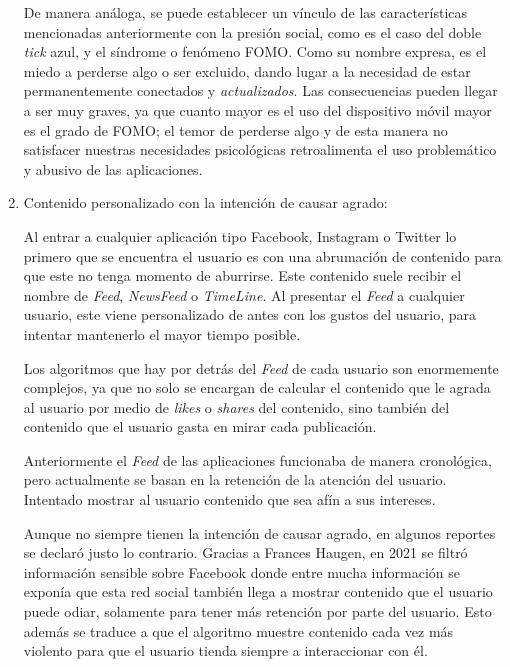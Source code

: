 \begin{enumerate}
    De manera análoga, se puede establecer un vínculo de las características mencionadas anteriormente con la presión social, como es el caso del doble \textit{tick} azul, y el síndrome o fenómeno \ac{FOMO}. Como su nombre expresa, es el miedo a perderse algo o ser excluido, dando lugar a la necesidad de estar permanentemente conectados y \textit{actualizados}. Las consecuencias pueden llegar a ser muy graves, ya que cuanto mayor es el uso del dispositivo móvil mayor es el grado de \acs{FOMO}; el temor de perderse algo y de esta manera no satisfacer nuestras necesidades psicológicas retroalimenta el uso problemático y abusivo de las aplicaciones. \cite{Adiccion-RRSS-FOMO}

    \item Contenido personalizado con la intención de causar agrado:

    Al entrar a cualquier aplicación tipo Facebook, Instagram o Twitter lo primero que se encuentra el usuario es con una abrumación de contenido para que este no tenga momento de aburrirse. Este contenido suele recibir el nombre de \textit{Feed}, \textit{NewsFeed} o \textit{TimeLine}. Al presentar el \textit{Feed} a cualquier usuario, este viene personalizado de antes con los gustos del usuario, para intentar mantenerlo el mayor tiempo posible.

    Los algoritmos que hay por detrás del \textit{Feed} de cada usuario son enormemente complejos, ya que no solo se encargan de calcular el contenido que le agrada al usuario por medio de \textit{likes} o \textit{shares} del contenido, sino también del contenido que el usuario gasta en mirar cada publicación.

    Anteriormente el \textit{Feed} de las aplicaciones funcionaba de manera cronológica, pero actualmente se basan en la retención de la atención del usuario. Intentado mostrar al usuario contenido que sea afín a sus intereses. \cite{Adiccion-RRSS-Edgerank}

    Aunque no siempre tienen la intención de causar agrado, en algunos reportes se declaró justo lo contrario. Gracias a Frances Haugen, en 2021 se filtró información sensible sobre Facebook donde entre mucha información se exponía que esta red social también llega a mostrar contenido que el usuario puede odiar, solamente para tener más retención por parte del usuario. \cite{Adiccion-RRSS-Odias} Esto además se traduce a que el algoritmo muestre contenido cada vez más violento para que el usuario tienda siempre a interaccionar con él.
    

\end{enumerate}
